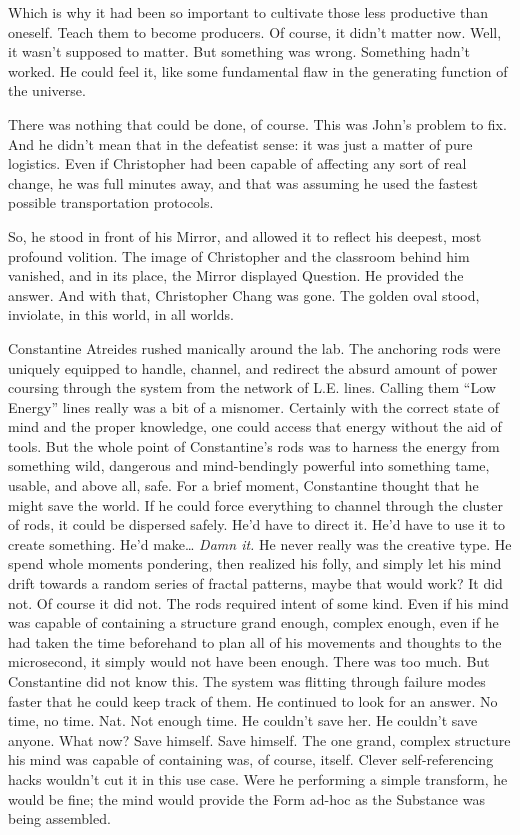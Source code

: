 Which is why it had been so important to cultivate those less productive than oneself. Teach them to become producers. Of course, it didn’t matter now. Well, it wasn’t supposed to matter. But something was wrong. Something hadn’t worked. He could feel it, like some fundamental flaw in the generating function of the universe.

There was nothing that could be done, of course. This was John’s problem to fix. And he didn’t mean that in the defeatist sense: it was just a matter of pure logistics. Even if Christopher had been capable of affecting any sort of real change, he was full minutes away, and that was assuming he used the fastest possible transportation protocols.

So, he stood in front of his Mirror, and allowed it to reflect his deepest, most profound volition. The image of Christopher and the classroom behind him vanished, and in its place, the Mirror displayed Question.
\SmallVSpace
He provided the answer. And with that, Christopher Chang was gone.
\SomeVSpace
The golden oval stood, inviolate, in this world, in all worlds.
\simpleline
{}

Constantine Atreides rushed manically around the lab. The anchoring rods were uniquely equipped to handle, channel, and redirect the absurd amount of power coursing through the system from the network of L.E. lines. Calling them “Low Energy” lines really was a bit of a misnomer. Certainly with the correct state of mind and the proper knowledge, one could access that energy without the aid of tools. But the whole point of Constantine’s rods was to harness the energy from something wild, dangerous and mind-bendingly powerful into something tame, usable, and above all, safe.
\SomeVSpace
For a brief moment, Constantine thought that he might save the world. If he could force everything to channel through the cluster of rods, it could be dispersed safely. He’d have to direct it. He’d have to use it to create something. He’d make…
\SmallVSpace
\emph{Damn it.}
\SmallVSpace
He never really was the creative type. He spend whole moments pondering, then realized his folly, and simply let his mind drift towards a random series of fractal patterns, maybe that would work?
\SmallVSpace
It did not.
\SmallVSpace
Of course it did not. The rods required intent of some kind.
\SmallVSpace
Even if his mind was capable of containing a structure grand enough, complex enough, even if he had taken the time beforehand to plan all of his movements and thoughts to the microsecond, it simply would not have been enough. There was too much. But Constantine did not know this. The system was flitting through failure modes faster that he could keep track of them. He continued to look for an answer. No time, no time.
\SomeVSpace
Nat.
\SomeVSpace
Not enough time. He couldn’t save her. He couldn’t save anyone. What now? Save himself. Save himself. The one grand, complex structure his mind was capable of containing was, of course, itself. Clever self-referencing hacks wouldn’t cut it in this use case. Were he performing a simple transform, he would be fine; the mind would provide the Form ad-hoc as the Substance was being assembled.

